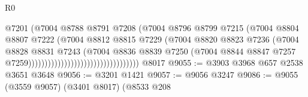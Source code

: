\begin{lexlean}{R0}
\begin{coremodule}
                                                        @7201
                                                        (@7004
                                                          @8788
                                                          @8791
                                                          @7208
                                                          (@7004
                                                            @8796
                                                            @8799
                                                            @7215
                                                            (@7004
                                                              @8804
                                                              @8807
                                                              @7222
                                                              (@7004
                                                                @8812
                                                                @8815
                                                                @7229
                                                                (@7004
                                                                  @8820
                                                                  @8823
                                                                  @7236
                                                                  (@7004
                                                                    @8828
                                                                    @8831
                                                                    @7243
                                                                    (@7004
                                                                      @8836
                                                                      @8839
                                                                      @7250
                                                                      (@7004
                                                                        @8844
                                                                        @8847
                                                                        @7257
                                                                        @7259))))))))))))))))))))))))))))))))))
    @8017
@9055 := @3903 @3968 @657 @2538 @3651 @3648
@9056 := @3201 @1421
@9057 := @9056 @3247
@9086 := @9055
    (@3559 @9057)
    (@3401 @8017)
    (@8533
      @208

\end{coremodule}
\end{lexlean}
